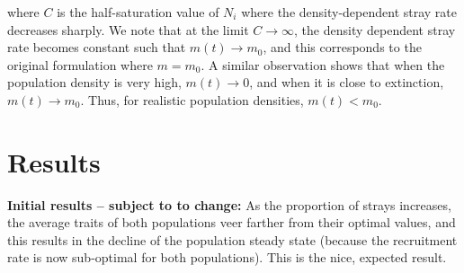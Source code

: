\documentclass[onecolumn,preprintnumbers,amsmath,amssymb,superscriptaddress]{revtex4}
\begin{document}
\noindent where $C$ is the half-saturation value of $N_i$ where the density-dependent stray rate decreases sharply.
We note that at the limit $C\rightarrow \infty$, the density dependent stray rate becomes constant such that $m(t) \rightarrow m_0$, and this corresponds to the original formulation where $m=m_0$.
A similar observation shows that when the population density is very high, $m(t) \rightarrow 0$, and when it is close to extinction, $m(t) \rightarrow m_0$.
Thus, for realistic population densities, $m(t) < m_0$.





\section*{Results}











{\bf Initial results -- subject to to change:} As the proportion of strays increases, the average traits of both populations veer farther from their optimal values, and this results in the decline of the population steady state (because the recruitment rate is now sub-optimal for both populations). This is the nice, expected result.
\end{document}

